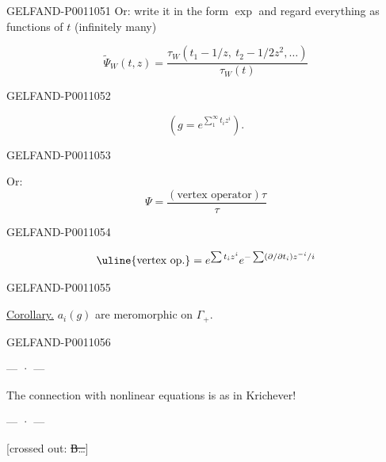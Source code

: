 \begin{GelfandAdjacentEvidence}{GELFAND-P001105}{1}
Or:
write it in the form $\exp$ and regard everything as functions of $t$ (infinitely many)

\[
\widetilde{\Psi}_W(t,z)=
\frac{\tau_W(t_1-1/z,\ t_2-1/2z^2,\ldots)}{\tau_W(t)}
\]
\end{GelfandAdjacentEvidence}
\begin{GelfandAdjacentEvidence}{GELFAND-P001105}{2}

\[
\left(g=e^{\sum_1^\infty t_i z^i}\right).
\]
\end{GelfandAdjacentEvidence}
\begin{GelfandAdjacentEvidence}{GELFAND-P001105}{3}


Or:
\[
\Psi=\frac{(\text{vertex operator})\tau}{\tau}
\]
\end{GelfandAdjacentEvidence}
\begin{GelfandAdjacentEvidence}{GELFAND-P001105}{4}

\[
\text{\uline{vertex op.}}=e^{\sum t_i z^i}
 e^{-\sum(\partial/\partial t_i)z^{-i}/i}
\]
\end{GelfandAdjacentEvidence}
\begin{GelfandAdjacentEvidence}{GELFAND-P001105}{5}


\underline{Corollary.} $a_i(g)$ are meromorphic on $\Gamma_+$.
\end{GelfandAdjacentEvidence}
\begin{GelfandAdjacentEvidence}{GELFAND-P001105}{6}


\begin{center}— · —\end{center}
The connection with nonlinear equations is as in Krichever!

\begin{center}— · —\end{center}
[crossed out: \sout{В\ldots}]
\end{GelfandAdjacentEvidence}
